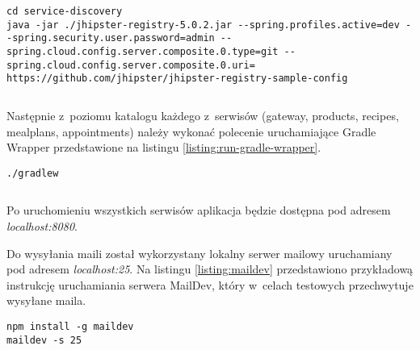 \noindent\hspace{.075\textwidth}\begin{minipage}{.85\textwidth}
    \begin{verbatim}
cd service-discovery
java -jar ./jhipster-registry-5.0.2.jar --spring.profiles.active=dev --spring.security.user.password=admin --spring.cloud.config.server.composite.0.type=git --spring.cloud.config.server.composite.0.uri= https://github.com/jhipster/jhipster-registry-sample-config
    \end{verbatim}
    \begin{lstlisting}[caption={Uruchamianie JHipster Registry \source{\ownwork}}, label={listing:service-discovery}]
\end{lstlisting}
\end{minipage}

Następnie z~poziomu katalogu każdego z~serwisów (gateway, products, recipes, mealplans, appointments)
należy wykonać polecenie uruchamiające Gradle Wrapper przedstawione na listingu \ref{listing:run-gradle-wrapper}.

\noindent\hspace{.075\textwidth}\begin{minipage}{.85\textwidth}
    \begin{verbatim}
./gradlew
    \end{verbatim}
    \begin{lstlisting}[caption={Uruchamianie Gradle Wrapper \source{\ownwork}}, label={listing:run-gradle-wrapper}]
\end{lstlisting}
\end{minipage}

Po uruchomieniu wszystkich serwisów aplikacja będzie dostępna pod adresem \textit{localhost:8080}.

\par
Do wysyłania maili został wykorzystany lokalny serwer mailowy uruchamiany pod adresem \textit{localhost:25}.
Na listingu \ref{listing:maildev} przedstawiono przykładową instrukcję uruchamiania serwera MailDev, który w~celach testowych przechwytuje wysyłane maila.

\noindent\hspace{.075\textwidth}\begin{minipage}{.85\textwidth}
    \begin{verbatim}
npm install -g maildev
maildev -s 25
    \end{verbatim}
    \begin{lstlisting}[caption={Uruchamianie serwera MailDev \source{\ownwork}}, label={listing:maildev}]
\end{lstlisting}
\end{minipage}

